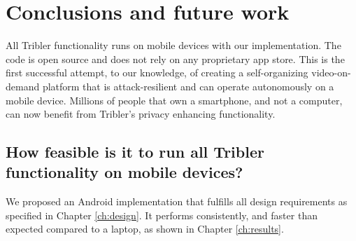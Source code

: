\chapter{Conclusions and future work}\label{ch:conclusions}

All Tribler functionality runs on mobile devices with our implementation.
The code is open source \cite{github_tribler_repo} and does not rely on any proprietary app store.
This is the first successful attempt, to our knowledge, of creating a self-organizing video-on-demand platform that is attack-resilient and can operate autonomously on a mobile device.
Millions of people that own a smartphone, and not a computer, can now benefit from Tribler's privacy enhancing functionality.


\section{How feasible is it to run all Tribler functionality on mobile devices?} %
We proposed an Android implementation that fulfills all design requirements as specified in Chapter \ref{ch:design}.
It performs consistently, and faster than expected compared to a laptop, as shown in Chapter \ref{ch:results}.

